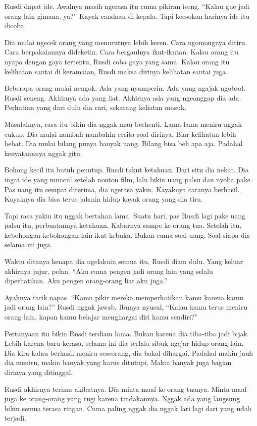 Rusdi dapat ide. Awalnya masih ngerasa itu cuma pikiran iseng. ``Kalau gue jadi orang lain gimana, ya?'' Kayak candaan di kepala. Tapi keesokan harinya ide itu dicoba.


Dia mulai ngecek orang yang menurutnya lebih keren. Cara ngomongnya ditiru. Cara berpakaiannya dideketin. Cara bergaulnya ikut-ikutan. Kalau orang itu nyapa dengan gaya tertentu, Rusdi coba gaya yang sama. Kalau orang itu kelihatan santai di keramaian, Rusdi maksa dirinya kelihatan santai juga.


Beberapa orang mulai nengok. Ada yang nyamperin. Ada yang ngajak ngobrol. Rusdi seneng. Akhirnya ada yang liat. Akhirnya ada yang ngeanggap dia ada. Perhatian yang dari dulu dia cari, sekarang keliatan masuk.


Masalahnya, rasa itu bikin dia nggak mau berhenti. Lama-lama meniru nggak cukup. Dia mulai nambah-nambahin cerita soal dirinya. Biar kelihatan lebih hebat. Dia mulai bilang punya banyak uang. Bilang bisa beli apa aja. Padahal kenyataannya nggak gitu.


Bohong kecil itu butuh penutup. Rusdi takut ketahuan. Dari situ dia nekat. Dia ingat ide yang muncul setelah nonton film, lalu bikin uang palsu dan nyoba pake. Pas uang itu sempat diterima, dia ngerasa yakin. Kayaknya caranya berhasil. Kayaknya dia bisa terus jalanin hidup kayak orang yang dia tiru.


Tapi rasa yakin itu nggak bertahan lama. Suatu hari, pas Rusdi lagi pake uang palsu itu, perbuatannya ketahuan. Kabarnya sampe ke orang tua. Setelah itu, kebohongan-kebohongan lain ikut kebuka. Bukan cuma soal uang. Soal siapa dia selama ini juga.


Waktu ditanya kenapa dia ngelakuin semua itu, Rusdi diam dulu. Yang keluar akhirnya jujur, pelan. ``Aku cuma pengen jadi orang lain yang selalu diperhatikan. Aku pengen orang-orang liat aku juga.''


Ayahnya tarik napas. ``Kamu pikir mereka memperhatikan kamu karena kamu jadi orang lain?'' Rusdi nggak jawab. Ibunya nyusul, ``Kalau kamu terus meniru orang lain, kapan kamu belajar menghargai diri kamu sendiri?''


Pertanyaan itu bikin Rusdi terdiam lama. Bukan karena dia tiba-tiba jadi bijak. Lebih karena baru kerasa, selama ini dia terlalu sibuk ngejar hidup orang lain. Dia kira kalau berhasil meniru seseorang, dia bakal dihargai. Padahal makin jauh dia meniru, makin banyak yang harus ditutupi. Makin banyak juga bagian dirinya yang ditinggal.


Rusdi akhirnya terima akibatnya. Dia minta maaf ke orang tuanya. Minta maaf juga ke orang-orang yang rugi karena tindakannya. Nggak ada yang langsung bikin semua terasa ringan. Cuma paling nggak dia nggak lari lagi dari yang udah terjadi.


